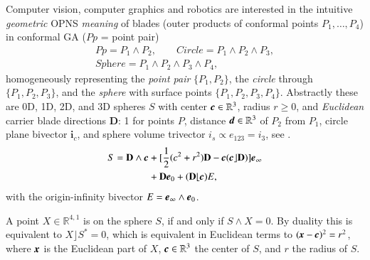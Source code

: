 \documentclass[cameraready]{jcmsi}%
\newcommand{\R}{\mathbb{R}}
\newcommand{\gvec}[1]{\ensuremath{\mbox{\textbf{\textit{#1}}}}}
\begin{document}
Computer vision, computer graphics and robotics are interested in the intuitive \textit{geometric} OPNS \textit{meaning} of blades (outer products of conformal points $P_1, \ldots , P_4$) in conformal GA ($Pp$ = point pair)
\begin{gather}
  Pp = P_1 \wedge P_2, 
  \qquad
  Circle = P_1 \wedge P_2\wedge P_3, 
  \nonumber \\
  \textit{Sphere} = P_1 \wedge P_2\wedge P_3 \wedge P_4,
\end{gather}
homogeneously representing the \textit{point pair} $\{P_1, P_2\}$, the \textit{circle} through $\{P_1, P_2, P_3\}$, and the \textit{sphere} with surface points $\{P_1, P_2, P_3, P_4\}$. Abstractly these are 0D, 1D, 2D, and 3D spheres $S$ with center $\gvec{c}\in \R^3$, radius $r\geq 0$, and \textit{Euclidean} carrier blade directions $\mathbf{D}$: 1 for points $P$, distance $\gvec{d}\in \R^3$ of $P_2$ from $P_1$, circle plane bivector $\mathbf{i}_c$, and sphere volume trivector $i_s \propto e_{123}=i_3$, see \cite{HTBY:Carrier}. 
\begin{align} 
  S = \mathbf{D}\wedge \gvec{c} 
      &+[\frac{1}{2}(c^2+r^2)\mathbf{D} - \gvec{c} (\gvec{c}\rfloor \mathbf{D})]\gvec{e}_{\infty}
      \nonumber \\
      &+ \mathbf{D}\gvec{e}_0 + (\mathbf{D}\lfloor \gvec{c})E,
\end{align}
with the origin-infinity bivector $E=\gvec{e}_{\infty}\wedge \gvec{e}_0$.

A point $X \in \R^{4,1}$ is on the sphere $S$, if and only if $S\wedge X=0$. By duality this is equivalent to $X\rfloor S^*=0$, which is equivalent in Euclidean terms to $(\gvec{x}-\gvec{c})^2=r^2$, where $\gvec{x}$ is the Euclidean part of $X$, $\gvec{c} \in \R^3$ the center of $S$, and $r$ the radius of $S$.  
\end{document}
